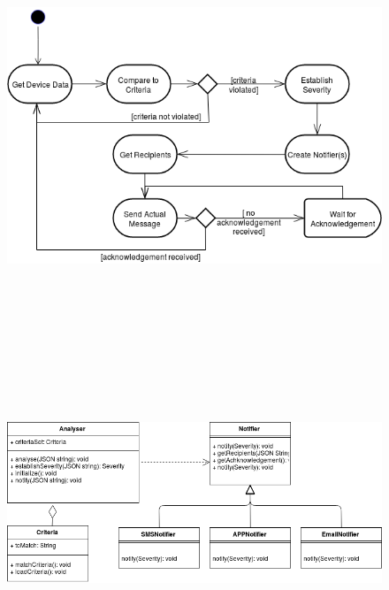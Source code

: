 \begin{center}
\begin{figure}[h]
	\includegraphics[width=15cm, height=13cm]{Notification/NotificationActivity.png}
\end{figure}
\end{center}

\begin{center}
\begin{figure}[h]
	\includegraphics[width=15cm, height=8cm]{Notification/NotificationsClass.png}
\end{figure}
\end{center}

